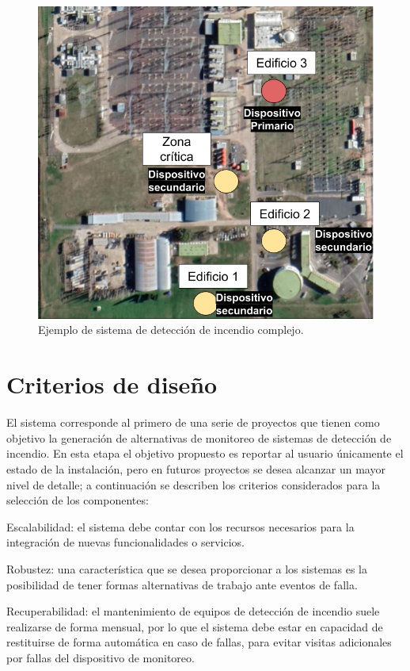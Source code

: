 \begin{figure}[]
	\centering
	\includegraphics[scale=.4]{./Figures/Capitulo3/Fig_A3.png}
	\caption{Ejemplo de sistema de detección de incendio complejo.}
	\label{fig:figura_a3}
\end{figure}

\section{Criterios de diseño}

El sistema corresponde al primero de una serie de proyectos que tienen como objetivo la generación de alternativas de monitoreo de sistemas de detección de incendio. En esta etapa el objetivo propuesto es reportar al usuario únicamente el estado de la instalación, pero en futuros proyectos se desea alcanzar un mayor nivel de detalle; a continuación se describen los criterios considerados para la selección de los componentes:

Escalabilidad: el sistema debe contar con los recursos necesarios para la integración de nuevas funcionalidades o servicios.

Robustez: una característica que se desea proporcionar a los sistemas es la posibilidad de tener formas alternativas de trabajo ante eventos de falla.

Recuperabilidad: el mantenimiento de equipos de detección de incendio suele realizarse de forma mensual, por lo que el sistema debe estar en capacidad de restituirse de forma automática en caso de fallas, para evitar visitas adicionales por fallas del dispositivo de monitoreo.

